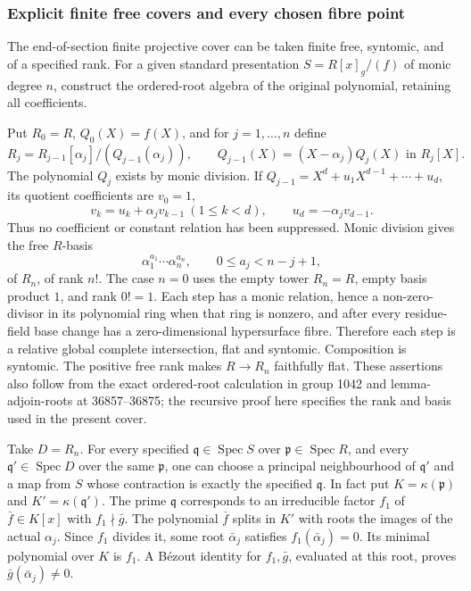 \subsubsection{Explicit finite free covers and every chosen fibre point}\label{explicit-finite-free-covers-and-every-chosen-fibre-point}

The end-of-section finite projective cover can be taken finite free, syntomic, and of a specified rank. For a given standard presentation \(S=R[x]_g/(f)\) of monic degree \(n\), construct the ordered-root algebra of the original polynomial, retaining all coefficients.

Put \(R_0=R\), \(Q_0(X)=f(X)\), and for \(j=1,\ldots,n\) define \[
R_j=R_{j-1}[\alpha_j]/(Q_{j-1}(\alpha_j)),
\qquad
Q_{j-1}(X)=(X-\alpha_j)Q_j(X)\text{ in }R_j[X].
\] The polynomial \(Q_j\) exists by monic division. If \(Q_{j-1}=X^d+u_1X^{d-1}+\cdots+u_d\), its quotient coefficients are \(v_0=1\), \[
v_k=u_k+\alpha_jv_{k-1}\ (1\le k<d),
\qquad u_d=-\alpha_jv_{d-1}.
\] Thus no coefficient or constant relation has been suppressed. Monic division gives the free \(R\)-basis \[
\alpha_1^{a_1}\cdots\alpha_n^{a_n},
\qquad 0\le a_j<n-j+1,
\] of \(R_n\), of rank \(n!\). The case \(n=0\) uses the empty tower \(R_n=R\), empty basis product \(1\), and rank \(0!=1\). Each step has a monic relation, hence a non-zero-divisor in its polynomial ring when that ring is nonzero, and after every residue-field base change has a zero-dimensional hypersurface fibre. Therefore each step is a relative global complete intersection, flat and syntomic. Composition is syntomic. The positive free rank makes \(R\to R_n\) faithfully flat. These assertions also follow from the exact ordered-root calculation in group 1042 and lemma-adjoin-roots at 36857--36875; the recursive proof here specifies the rank and basis used in the present cover.

Take \(D=R_n\). For every specified \(\mathfrak q\in\operatorname{Spec}S\) over \(\mathfrak p\in\operatorname{Spec}R\), and every \(\mathfrak q'\in\operatorname{Spec}D\) over the same \(\mathfrak p\), one can choose a principal neighbourhood of \(\mathfrak q'\) and a map from \(S\) whose contraction is exactly the specified \(\mathfrak q\). In fact put \(K=\kappa(\mathfrak p)\) and \(K'=\kappa(\mathfrak q')\). The prime \(\mathfrak q\) corresponds to an irreducible factor \(f_1\) of \(\bar f\in K[x]\) with \(f_1\nmid\bar g\). The polynomial \(\bar f\) splits in \(K'\) with roots the images of the actual \(\alpha_j\). Since \(f_1\) divides it, some root \(\bar\alpha_j\) satisfies \(f_1(\bar\alpha_j)=0\). Its minimal polynomial over \(K\) is \(f_1\). A Bézout identity for \(f_1,\bar g\), evaluated at this root, proves \(\bar g(\bar\alpha_j)\ne0\).

